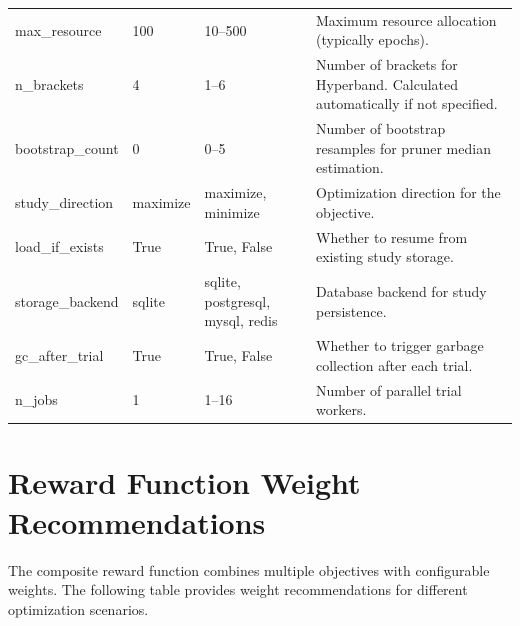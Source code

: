 \begin{longtable}{p{3.5cm}p{2cm}p{2.5cm}p{5.5cm}}
\addlinespace
max\_resource & 100 & 10--500 & Maximum resource allocation (typically epochs). \\
\addlinespace
n\_brackets & 4 & 1--6 & Number of brackets for Hyperband. Calculated automatically if not specified. \\
\addlinespace
bootstrap\_count & 0 & 0--5 & Number of bootstrap resamples for pruner median estimation. \\
\addlinespace
study\_direction & maximize & maximize, minimize & Optimization direction for the objective. \\
\addlinespace
load\_if\_exists & True & True, False & Whether to resume from existing study storage. \\
\addlinespace
storage\_backend & sqlite & sqlite, postgresql, mysql, redis & Database backend for study persistence. \\
\addlinespace
gc\_after\_trial & True & True, False & Whether to trigger garbage collection after each trial. \\
\addlinespace
n\_jobs & 1 & 1--16 & Number of parallel trial workers. \\
\end{longtable}

\section{Reward Function Weight Recommendations}
\label{sec:reward_weights}

The composite reward function combines multiple objectives with configurable weights. The following table provides weight recommendations for different optimization scenarios.

